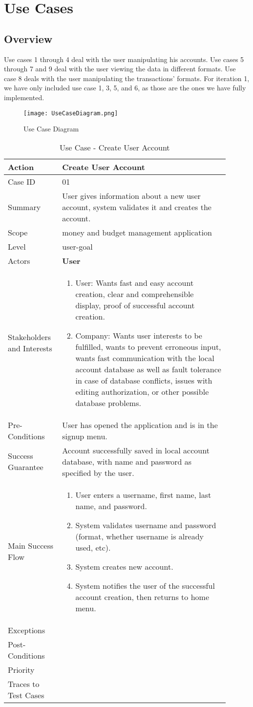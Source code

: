 \documentclass[11pt]{article}
\newcounter{use case ID}
\newcommand\tabularhead[1]{
\begin{table}[ht]
    \addtocounter{use case ID}{1}
    \caption{Use Case \arabic{use case ID} - #1}
    \vspace{0.2cm}
    \begin{tabular}{|p{0.2\linewidth}|p{0.70\linewidth}|}
    \hline
        \textbf{Action} & \textbf{#1} \\
        \hline}
\newcommand\addrow[2]{#1 & #2\\ \hline}
\newcommand\addmulrow[2]{ \begin{minipage}[t][][t]{2.5cm}#1\end{minipage}
        &\begin{minipage}[t][][t]{11cm}
        \begin{enumerate}[itemsep=-1ex] #2   \end{enumerate}
    \end{minipage}\vfill\\ \hline}
\newenvironment{usecase}{\tabularhead}
{\hline\end{tabular}\end{table}}
\begin{document}
\section{Use Cases}
\subsection{Overview}
Use cases 1 through 4 deal with the user manipulating his accounts. Use cases 5 through 7 and 9 deal with the user viewing the data in different formats. Use case 8 deals with the user manipulating the transactions' formats. For iteration 1, we have only included use case 1, 3, 5, and 6, as those are the ones we have fully implemented.

\begin{figure}[htbp]
\texttt{[image: UseCaseDiagram.png]}
\caption{Use Case Diagram}
\label{fig:use-case-diagram}
\end{figure}

\begin{usecase}{Create User Account}
    \addrow{Case ID}{01}
    \addrow{Summary}{User gives information about a new user account, system validates it and creates the account.}
    \addrow{Scope}{money and budget management application}
    \addrow{Level}{user-goal}
    \addrow{Actors}{\textbf{User}}
    \addmulrow{Stakeholders and Interests}{
        \item User: Wants fast and easy account creation, clear and comprehensible display, proof of successful account creation.
        \item Company: Wants user interests to be fulfilled, wants to prevent erroneous input, wants fast communication with the local account database as well as fault tolerance in case of database conflicts, issues with editing authorization, or other possible database problems.}
    \addrow{Pre-Conditions}{User has opened the application and is in the signup menu.}
    \addrow{Success Guarantee}{Account successfully saved in local account database, with name and password as specified by the user.}
    \addmulrow{Main Success Flow}{
        \item User enters a username, first name, last name, and password.
        \item System validates username and password (format, whether username is already used, etc).
        \item System creates new account.
        \item System notifies the user of the successful account creation, then returns to home menu.}
    \addrow{Exceptions}{}
    \addrow{Post-Conditions}{}
    \addrow{Priority}{}
    \addrow{Traces to Test Cases}{}
\end{usecase}
\end{document}
